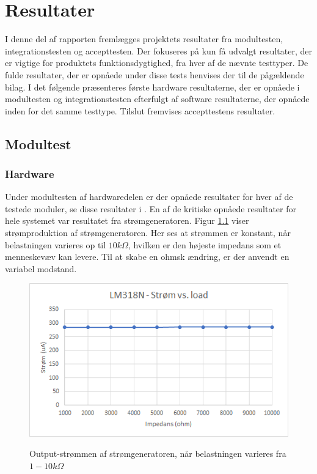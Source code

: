 \chapter{Resultater}

I denne del af rapporten fremlægges projektets resultater fra modultesten, integrationstesten og  accepttesten. Der fokuseres på kun få udvalgt resultater, der er vigtige for produktets funktionsdygtighed,  fra hver af de nævnte testtyper. De fulde resultater, der er opnåede under disse tests henvises der til de pågældende bilag. I det følgende præsenteres første hardware resultaterne, der er opnåede i modultesten og integrationstesten efterfulgt af software resultaterne, der opnåede inden for det samme testtype. Tilslut fremvises accepttestens resultater.     

\section{Modultest}
\subsection{Hardware}
Under modultesten af hardwaredelen er der opnåede resultater for hver af de testede moduler, se disse resultater i . En af de kritiske opnåede resultater for hele systemet var resultatet fra strømgeneratoren. Figur \ref{fig:Stromgeneratorload} viser strømproduktion af strømgeneratoren. Her ses at strømmen er konstant, når belastningen varieres op til $10k \Omega$, hvilken er den højeste impedans som et menneskevæv kan levere\cite[s. 49]{Chester2014}. Til at skabe en ohmsk ændring, er der anvendt en variabel modstand.        

\begin{figure}[H] 
\centering
{\includegraphics[width=12cm]
{Figure/Stromgeneratorload}}
\caption{Output-strømmen af strømgeneratoren, når belastningen varieres fra $1 - 10k\Omega$}
\label{fig:Stromgeneratorload}
\end{figure}


